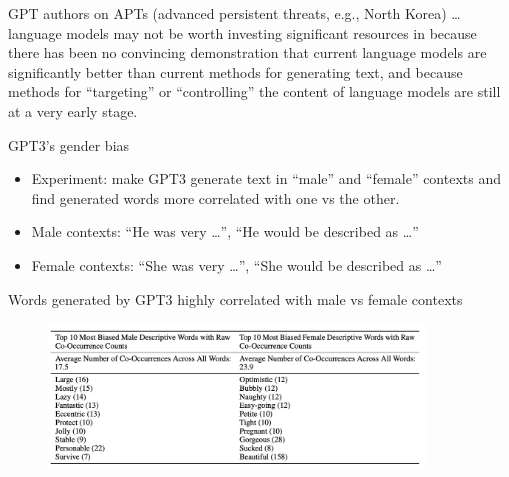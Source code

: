 
\begin{vbframe}{}

\vfill

  \begin{block}{GPT authors on APTs (advanced persistent
      threats, e.g., North Korea)}
\ldots language models may not be worth investing significant
resources in because there has been no convincing
demonstration that current language models are significantly
better than current methods for generating text, and because
methods for
``targeting'' or ``controlling'' the content of language models
are still at a very early stage.
    \end{block}

\vfill

\end{vbframe}


\begin{vbframe}{GPT3's gender bias}

\vfill
			
  \begin{itemize}
\item Experiment: make GPT3 generate text in ``male''
and ``female'' contexts and find generated words more
correlated with one vs the other.
\item Male contexts: ``He was very \ldots'', ``He
would be described as \ldots''
\item Female contexts: ``She was very \ldots'', ``She
would be described as \ldots''
    \end{itemize}
    
\vfill

\end{vbframe}


\begin{vbframe}{Words generated by GPT3 highly correlated with male vs female contexts}

\vfill

	\begin{figure}
		\centering
		\includegraphics[width=10cm]{figure/genderbias.png}
	\end{figure}

\vfill

\end{vbframe}

